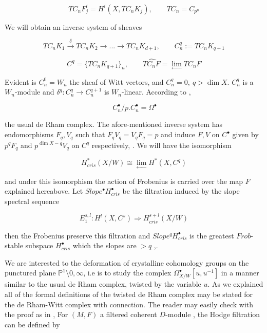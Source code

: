 \documentclass[12pt,twoside]{amsart}
\begin{document}
\[ TC_nF_j^i=H^i(X,TC_nK_j), \qquad TC_n=C_{p^n} \] 

\vspace{0.5cm}

\noindent
We will obtain an inverse system of sheaves 

\[ TC_nK_1 \stackrel{\delta}{\rightarrow} TC_nK_2 \to ...\to TC_nK_{d+1} , \qquad C_n^q:=TC_nK_{q+1}  \]

\[ C^q=\{TC_nK_{q+1}\}_n , \qquad \widehat{TC_nF}=\lim_{\leftarrow}TC_nF \] 

\vspace{0.5cm}

\noindent
Evident is $C_n^0=W_n$ the sheaf of Witt vectors, and $C_n^q=0, \ q >\dim X$. $C_n^q$ is a $W_n$-module and $\delta^q:C_n^q \to C_n^{q+1}$ is $W_n$-linear. According to \cite{BL}, 

\[ \ C_n^{\bullet}/p.C_n^{\bullet}=\Omega^{\bullet} \]

\vspace{0.5cm}

\noindent
the usual de Rham complex. The afore-mentioned inverse system has endomorphisms $F_q,V_q$ such that $F_qV_q=V_qF_q=p$ and induce $F,V$ on $C^{\bullet}$ given by $p^qF_q$ and $p^{\dim X-q}V_q$ on $C^q$ respectively, \cite{BL}. We will have the isomorphism 

\[ H^*_{cris}(X/W) \cong \lim_{\leftarrow} H^*(X,C^q) \]

\vspace{0.5cm}

\noindent
and under this isomorphism the action of Frobenius is carried over the map $F$ explained hereabove. Let $Slope^{\bullet}H_{cris}^{\bullet}$ be the filtration induced by the slope spectral sequence 

\[ E_1^{s,l}:H^l(X,C^s) \Longrightarrow H_{cris}^{s+l}(X/W) \]

\vspace{0.5cm}

\noindent
then the Frobenius preserve this filtration and $Slope^qH_{cris}^{\bullet}$ is the greatest $Frob$-stable subspace $H_{cris}^{\bullet}$ which the slopes are $>q$ ,\cite{BL}.

\vspace{0.5cm}

\noindent
We are interested to the deformation of crystalline cohomology groups on the punctured plane $\mathbb{P}^1 \setminus 0, \infty$, i.e is to study the complex $\Omega_{X/W}^{\bullet}[u,u^{-1}]$ in a manner similar to the usual de Rham complex, twisted by the variable $u$. As we explained all of the formal definitions of the twisted de Rham complex may be stated for the de Rham-Witt complex with connection. The reader may easily check with the proof as in \cite{SAB1}, For $(M,F)$ a filtered coherent $D$-module , the Hodge filtration can be defined by 
\end{document}
